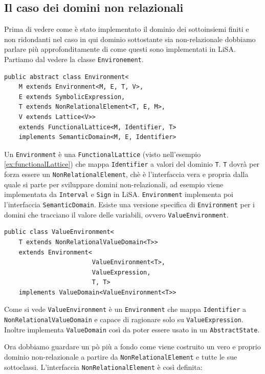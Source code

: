\subsection{Il caso dei domini non relazionali}

Prima di vedere come è stato implementato il dominio dei sottoinsiemi finiti e non ridondanti nel caso in qui dominio sottostante sia non-relazionale dobbiamo parlare più approfonditamente di come questi sono implementati in LiSA. Partiamo dal vedere la classe \texttt{Environement}. 

\begin{lstlisting}[belowskip=-1.1 \baselineskip]
public abstract class Environment<
    M extends Environment<M, E, T, V>,
    E extends SymbolicExpression,
    T extends NonRelationalElement<T, E, M>,
    V extends Lattice<V>>
    extends FunctionalLattice<M, Identifier, T> 
    implements SemanticDomain<M, E, Identifier>
\end{lstlisting}
Un \texttt{Environment} è una \texttt{FunctionalLattice} (visto nell'esempio \ref{ex:functionalLattice}) che mappa \texttt{Identifier} a valori del dominio \texttt{T}. \texttt{T} dovrà per forza essere un \texttt{NonRelationalElement}, chè è l'interfaccia vera e propria dalla quale si parte per sviluppare domini non-relazionali, ad esempio viene implementata da \texttt{Interval} e \texttt{Sign} in LiSA. \texttt{Environment} implementa poi l'interfaccia \texttt{SemanticDomain}. Esiste una versione specifica di \texttt{Environment} per i domini che tracciano il valore delle variabili, ovvero \texttt{ValueEnvironment}.

\begin{lstlisting}[belowskip=-1.1 \baselineskip]
public class ValueEnvironment<
    T extends NonRelationalValueDomain<T>>
    extends Environment<
                        ValueEnvironment<T>, 
                        ValueExpression, 
                        T, T>
    implements ValueDomain<ValueEnvironment<T>> 
\end{lstlisting}
Come si vede \texttt{ValueEnvironment} è un \texttt{Environment} che mappa \texttt{Identifier} a \texttt{NonRelationalValueDomain} e capace di ragionare solo su \texttt{ValueExpression}. Inoltre implementa \texttt{ValueDomain} così da poter essere usato in un \texttt{AbstractState}.

Ora dobbiamo guardare un pò più a fondo come viene costruito un vero e proprio dominio non-relazionale a partire da \texttt{NonRelationalElement} e tutte le sue sottoclassi. L'interfaccia \texttt{NonRelationalElement} è così definita:

